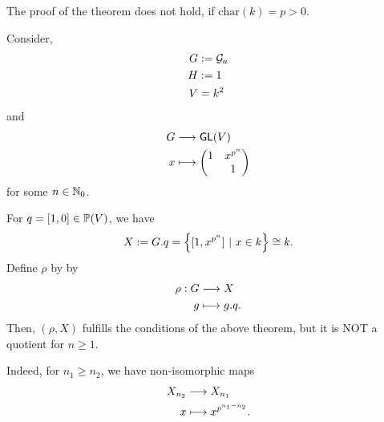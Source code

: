 \begin{example}
	The proof of the theorem does not hold, if $\mathrm{char} (k) = p > 0$.
	
	Consider,
	\begin{align*}
	 G &:= \G_a\\
	 H &:= 1\\
	 V &= k^2\\
	\end{align*}
	and
	\begin{align*}
	G & \Pfeil{} \GL(V)\\
	x &\longmapsto \mat{1 & x^{p^n}\\  & 1}
	\end{align*}
	for some $n \in \N_0$.
	
	For $q = [1,0] \in \P(V)$, we have
	\[ X:= G.q = \set{[1,x^{p^n}]}{x \in k} \isom{} k. \]
	Define $\rho$ by by
	\begin{align*}
	\rho : G & \Pfeil{} X\\
	g & \longmapsto g.q.
	\end{align*}
	Then, $(\rho, X)$ fulfills the conditions of the above theorem, but it is NOT a quotient for $n \geq 1$.
	
	Indeed, for $n_1 \geq n_2$, we have non-isomorphic maps
	\begin{align*}
	X_{n_2} & \Pfeil{} X_{n_1}\\
	x & \longmapsto x^{p^{n_1 - n_2}}.
	\end{align*}
\end{example}